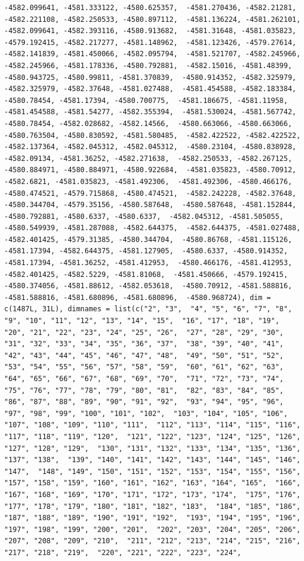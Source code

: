 \documentclass[
]{article}
\begin{document}
\begin{verbatim}
-4582.099641, -4581.333122, -4580.625357,  -4581.270436, -4582.21281, -4582.221108, -4582.250533, -4580.897112,  -4581.136224, -4581.262101, -4582.099641, -4582.393116, -4580.913682,  -4581.31648, -4581.035823, -4579.192415, -4582.217277, -4581.148962,  -4581.123426, -4579.27614, -4582.141839, -4581.450066, -4582.095794,  -4581.521707, -4582.245966, -4582.245966, -4581.178336, -4580.792881,  -4582.15016, -4581.48399, -4580.943725, -4580.99811, -4581.370839,  -4580.914352, -4582.325979, -4582.325979, -4582.37648, -4581.027488,  -4581.454588, -4582.183384, -4580.78454, -4581.17394, -4580.700775,  -4581.186675, -4581.11958, -4581.454588, -4581.54277, -4582.355394,  -4581.530024, -4581.567742, -4580.78454, -4582.028682, -4582.14566,  -4580.663066, -4580.663066, -4580.763504, -4580.830592, -4581.580485,  -4582.422522, -4582.422522, -4582.137364, -4582.045312, -4582.045312,  -4580.23104, -4580.838928, -4582.09134, -4581.36252, -4582.271638,  -4582.250533, -4582.267125, -4580.884971, -4580.884971, -4580.922684,  -4581.035823, -4580.70912, -4582.6821, -4581.035823, -4581.492306,  -4581.492306, -4580.466176, -4580.474521, -4579.715868, -4580.474521,  -4582.242228, -4582.37648, -4580.344704, -4579.35156, -4580.587648,  -4580.587648, -4581.152844, -4580.792881, -4580.6337, -4580.6337,  -4582.045312, -4581.505055, -4580.549939, -4581.287088, -4582.644375,  -4582.644375, -4581.027488, -4582.401425, -4579.31385, -4580.344704,  -4580.86768, -4581.115126, -4581.17394, -4582.644375, -4581.127905,  -4580.6337, -4580.914352, -4581.17394, -4581.36252, -4581.412953,  -4580.466176, -4581.412953, -4582.401425, -4582.5229, -4581.81068,  -4581.450666, -4579.192415, -4580.374056, -4581.88612, -4582.053618,  -4580.70912, -4581.588816, -4581.588816, -4581.680896, -4581.680896,  -4580.968724), dim = c(1487L, 31L), dimnames = list(c("2", "3",  "4", "5", "6", "7", "8", "9", "10", "11", "12", "13", "14", "15",  "16", "17", "18", "19", "20", "21", "22", "23", "24", "25", "26",  "27", "28", "29", "30", "31", "32", "33", "34", "35", "36", "37",  "38", "39", "40", "41", "42", "43", "44", "45", "46", "47", "48",  "49", "50", "51", "52", "53", "54", "55", "56", "57", "58", "59",  "60", "61", "62", "63", "64", "65", "66", "67", "68", "69", "70",  "71", "72", "73", "74", "75", "76", "77", "78", "79", "80", "81",  "82", "83", "84", "85", "86", "87", "88", "89", "90", "91", "92",  "93", "94", "95", "96", "97", "98", "99", "100", "101", "102",  "103", "104", "105", "106", "107", "108", "109", "110", "111",  "112", "113", "114", "115", "116", "117", "118", "119", "120",  "121", "122", "123", "124", "125", "126", "127", "128", "129",  "130", "131", "132", "133", "134", "135", "136", "137", "138",  "139", "140", "141", "142", "143", "144", "145", "146", "147",  "148", "149", "150", "151", "152", "153", "154", "155", "156",  "157", "158", "159", "160", "161", "162", "163", "164", "165",  "166", "167", "168", "169", "170", "171", "172", "173", "174",  "175", "176", "177", "178", "179", "180", "181", "182", "183",  "184", "185", "186", "187", "188", "189", "190", "191", "192",  "193", "194", "195", "196", "197", "198", "199", "200", "201",  "202", "203", "204", "205", "206", "207", "208", "209", "210",  "211", "212", "213", "214", "215", "216", "217", "218", "219",  "220", "221", "222", "223", "224", 
\end{verbatim}
\end{document}
